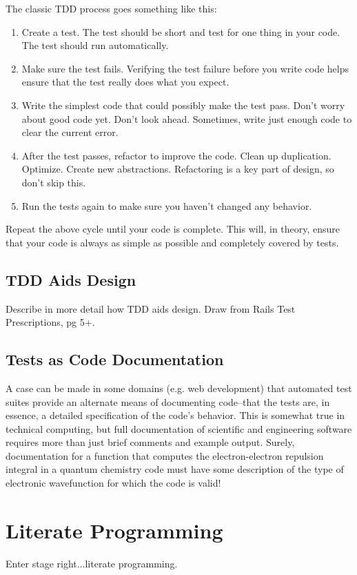 The classic TDD process goes something like this:
\begin{enumerate}
\item Create a test. The test should be short and test for one thing in your code. The test
should run automatically.
\item Make sure the test fails. Verifying the test failure before you write code helps ensure
that the test really does what you expect.
\item Write the simplest code that could possibly make the test pass. Don't worry about good
code yet. Don't look ahead. Sometimes, write just enough code to clear the current error.
\item After the test passes, refactor to improve the code. Clean up duplication. Optimize.
Create new abstractions. Refactoring is a key part of design, so don't skip this. 
\item Run the tests again to make sure you haven't changed any behavior.
\end{enumerate}

Repeat the above cycle until your code is complete. This will, in theory, ensure that your code is
always as simple as possible and completely covered by tests. 

\subsection{TDD Aids Design}

\begin{TODO}
Describe in more detail how TDD aids design. Draw from Rails Test Prescriptions, pg 5+.
\end{TODO}

\subsection{Tests as Code Documentation}
A case can be made in some domains (e.g. web development) that automated test suites 
provide an alternate means of documenting code--that
the tests are, in essence, a detailed specification of the code's behavior. This is somewhat true in
technical computing, but full documentation of scientific and engineering software requires 
more than just brief comments and example output. Surely, documentation for a function that computes 
the electron-electron repulsion integral in a quantum chemistry code must have some description
of the type of electronic wavefunction for which the code is valid!

\section{Literate Programming}
Enter stage right...literate programming. 


